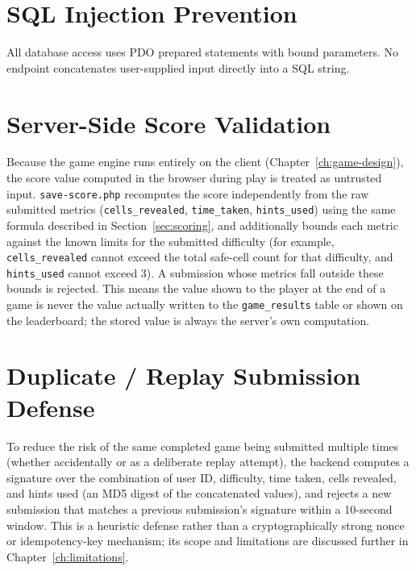 \section{SQL Injection Prevention}
All database access uses PDO prepared statements with bound parameters. No
endpoint concatenates user-supplied input directly into a SQL string.

\section{Server-Side Score Validation}
\label{sec:score-validation}
Because the game engine runs entirely on the client
(Chapter~\ref{ch:game-design}), the score value computed in the browser
during play is treated as untrusted input. \texttt{save-score.php}
recomputes the score independently from the raw submitted metrics
(\texttt{cells\_revealed}, \texttt{time\_taken}, \texttt{hints\_used}) using
the same formula described in Section~\ref{sec:scoring}, and additionally
bounds each metric against the known limits for the submitted difficulty
(for example, \texttt{cells\_revealed} cannot exceed the total safe-cell
count for that difficulty, and \texttt{hints\_used} cannot exceed 3). A
submission whose metrics fall outside these bounds is rejected. This means
the value shown to the player at the end of a game is never the value
actually written to the \texttt{game\_results} table or shown on the
leaderboard; the stored value is always the server's own computation.

\section{Duplicate / Replay Submission Defense}
To reduce the risk of the same completed game being submitted multiple
times (whether accidentally or as a deliberate replay attempt), the backend
computes a signature over the combination of user ID, difficulty, time
taken, cells revealed, and hints used (an MD5 digest of the concatenated
values), and rejects a new submission that matches a previous submission's
signature within a 10-second window. This is a heuristic defense rather
than a cryptographically strong nonce or idempotency-key mechanism; its
scope and limitations are discussed further in
Chapter~\ref{ch:limitations}.

